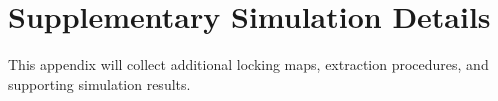 \chapter{Supplementary Simulation Details}

This appendix will collect additional locking maps, extraction procedures, and supporting simulation results.
